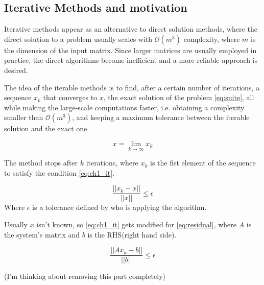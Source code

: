 \subsection{Iterative Methods and motivation}


Iterative methods appear as an alternative to direct solution methods, where the direct solution to a problem usually scales with $\mathcal{O}(m^{3})$ complexity, where $m$ is the dimension of the input matrix. Since larger matrices are usually employed in practice, the direct algorithms become inefficient and a more reliable approach is desired.


The idea of the iterable methods is to find, after a certain number of iterations, a sequence ${x_{k}}$ that converges to $x$, the exact solution of the problem \ref{eq:suite}, all while making the large-scale computations faster, i.e. obtaining a complexity smaller than $\mathcal{O}(m^{3})$, and keeping a maximum tolerance between the iterable solution and the exact one.


\begin{equation}\label{eq:suite}
    x = \lim_{k \to \infty} x_{k}
\end{equation}


The method stops after $k$ iterations, where $x_{k}$ is the fist element of the sequence to satisfy the condition \ref{eq:ch1_it}.


\begin{equation}\label{eq:ch1_it}
    \frac{||x_{k} - x||}{||x||} \leq \epsilon
\end{equation}
Where $\epsilon$ is a tolerance defined by who is applying the algorithm.

Usually $x$ isn't known, so \ref{eq:ch1_it} gets modified for \ref{eq:residual}, where $A$ is the system's matrix and $b$ is the RHS(right hand side).

\begin{equation}\label{eq:residual}
    \frac{||Ax_{k} - b||}{||b||} \leq \epsilon
\end{equation}

(I'm thinking about removing this part completely)

